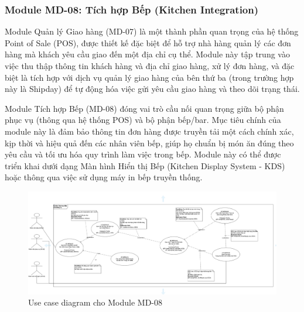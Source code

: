 \subsubsection{Module MD-08: Tích hợp Bếp (Kitchen Integration)}
Module Quản lý Giao hàng (MD-07) là một thành phần quan trọng của hệ thống Point of Sale (POS), được thiết kế đặc biệt để hỗ trợ nhà hàng quản lý các đơn hàng mà khách yêu cầu giao đến một địa chỉ cụ thể. Module này tập trung vào việc thu thập thông tin khách hàng và địa chỉ giao hàng, xử lý đơn hàng, và đặc biệt là tích hợp với dịch vụ quản lý giao hàng của bên thứ ba (trong trường hợp này là Shipday) để tự động hóa việc gửi yêu cầu giao hàng và theo dõi trạng thái.

Module Tích hợp Bếp (MD-08) đóng vai trò cầu nối quan trọng giữa bộ phận phục vụ (thông qua hệ thống POS) và bộ phận bếp/bar. Mục tiêu chính của module này là đảm bảo thông tin đơn hàng được truyền tải một cách chính xác, kịp thời và hiệu quả đến các nhân viên bếp, giúp họ chuẩn bị món ăn đúng theo yêu cầu và tối ưu hóa quy trình làm việc trong bếp. Module này có thể được triển khai dưới dạng Màn hình Hiển thị Bếp (Kitchen Display System - KDS) hoặc thông qua việc sử dụng máy in bếp truyền thống.


\begin{figure}[H]
    \centering
    \includegraphics[width=15cm]{Sections/tong_quan/functional_spec/img/uc8.png}
    \vspace{0.5cm}
    \caption{Use case diagram cho Module MD-08}
    \label{fig:my_label}
\end{figure}

